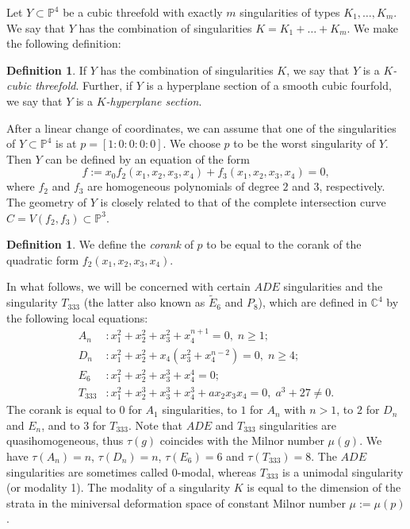 \documentclass[12pt]{amsart}
\numberwithin{equation}{section}
\theoremstyle{plain}
\theoremstyle{remark}
\theoremstyle{definition}
\newtheorem{definition}[equation]{Definition}
\newcommand{\bP}{\mathbb{P}}
\newcommand{\bC}{\mathbb{C}}
\begin{document}
Let $Y\subset\bP^4$ be a cubic threefold with exactly $m$ singularities of types $K_1,\ldots,K_m$. We say that $Y$ has the combination of singularities $K=K_1+\ldots+K_m$. We make the following definition:

\begin{definition} 
    If $Y$ has the combination of singularities $K$, we say that $Y$ is a \textit{$K$-cubic threefold}. Further, if $Y$ is a hyperplane section of a smooth cubic fourfold, we say that $Y$ is a \textit{$K$-hyperplane section}.
\end{definition}

After a linear change of coordinates, we can assume that one of the singularities of $Y\subset \bP^4$ is at $p=[1:0:0:0:0]$. We choose $p$ to be the worst singularity of $Y$. Then $Y$ can be defined by an equation of the form
\[
    f:=x_0f_2(x_1,x_2,x_3,x_4)+f_3(x_1,x_2,x_3,x_4)=0,
\]
where $f_2$ and $f_3$ are homogeneous polynomials of degree $2$ and $3$, respectively. The geometry of $Y$ is closely related to that of the complete intersection curve $C=V(f_2,f_3)\subset\bP^3$.

\begin{definition}
    We define the \textit{corank} of $p$ to be equal to the corank of the quadratic form $f_2(x_1,x_2,x_3,x_4)$.
\end{definition}

In what follows, we will be concerned with certain $ADE$ singularities and the singularity $T_{333}$ (the latter also known as $\tilde{E}_6$ and $P_8$), which are defined in $\bC^4$ by the following local equations:
\[
\begin{aligned}
    A_n&: x_1^2+x_2^2+x_3^2+x_4^{n+1}=0,\; n\geq 1;\\
    D_n&: x_1^2+x_2^2+x_4(x_3^2+x_4^{n-2})=0,\; n\geq 4;\\
    E_6&: x_1^2+x_2^2+x_3^3+x_4^4=0;\\
    T_{333}&: x_1^2+x_2^3+x_3^3+x_4^3+ax_2x_3x_4=0,\; a^3+27\neq 0.
\end{aligned}
\]
The corank is equal to $0$ for $A_1$ singularities, to $1$ for $A_n$ with $n>1$, to $2$ for $D_n$ and $E_n$, and to $3$ for $T_{333}$. Note that $ADE$ and $T_{333}$ singularities are quasihomogeneous, thus $\tau(g)$ coincides with the Milnor number $\mu(g)$. We have $\tau(A_n)=n$, $\tau(D_n)=n$, $\tau(E_6)=6$ and $\tau(T_{333})=8$. The $ADE$ singularities are sometimes called 0-modal, whereas $T_{333}$ is a unimodal singularity (or modality 1). The modality of a singularity $K$ is equal to the dimension of the strata in the miniversal deformation space of constant Milnor number $\mu:=\mu(p)$ \cite{Gab1}. 
\end{document}
